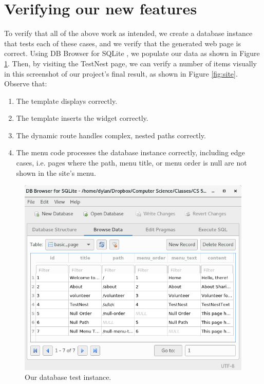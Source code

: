 \section{Verifying our new features}

To verify that all of the above work as intended, we create a database instance that tests each of these cases, and we verify that the generated web page is correct. Using DB Browser for SQLite \cite{sqliteBrowser}, we populate our data as shown in Figure \ref{fig:db}. Then, by visiting the TestNest page, we can verify a number of items visually in this screenshot of our project's final result, as shown in Figure \ref{fig:site}. Observe that:

\begin{enumerate}
  \item The template displays correctly.
  \item The template inserts the  widget correctly.
  \item The dynamic route handles complex, nested paths correctly.
  \item The menu code processes the database instance correctly, including edge cases, i.e. pages where the path, menu title, or menu order is null are not shown in the site's menu.
\end{enumerate}

\begin{figure}[h]
  \centering
  \includegraphics[width=4.4in]{db.png}
  \caption{Our database test instance.}
  \label{fig:db}
\end{figure}

